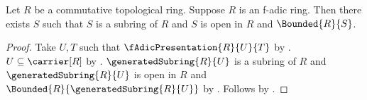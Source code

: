 \begin{corollary}\label{f_adic_ring_has_open_bounded_subring}
    Let $R$ be a commutative topological ring.
    Suppose $R$ is an f-adic ring.
    Then there exists $S$ such that $S$ is a subring of $R$ and
        $S$ is open in $R$ and $\Bounded{R}{S}$.
\end{corollary}
\begin{proof}
    Take $U,T$ such that $\fAdicPresentation{R}{U}{T}$ by
        .
    $U\subseteq\carrier[R]$ by .
    $\generatedSubring{R}{U}$ is a subring of $R$ and
        $\generatedSubring{R}{U}$ is open in $R$ and
        $\Bounded{R}{\generatedSubring{R}{U}}$ by
        .
    Follows by \auto.
\end{proof}
